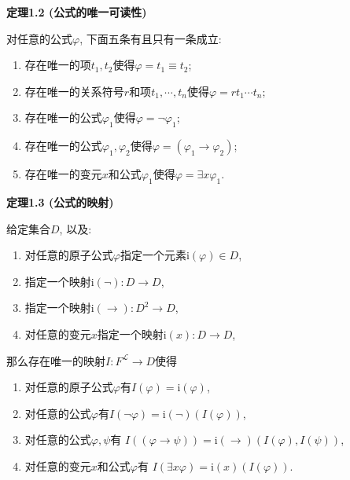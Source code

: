 \documentclass[UTF8]{ctexart}
\begin{document}
\newpage

\hypertarget{sec:定理1.2}{}
\noindent\textbf{定理1.2 (公式的唯一可读性)}

对任意的公式$\varphi$, 下面五条有且只有一条成立:
\begin{enumerate}
    \item 存在唯一的项$t_1,t_2$使得$\varphi=t_1\equiv t_2$;
    \item 存在唯一的关系符号$r$和项$t_1,\cdots,t_n$使得$\varphi=rt_1\cdots t_n$;
    \item 存在唯一的公式$\varphi_1$使得$\varphi=\neg\varphi_1$;
    \item 存在唯一的公式$\varphi_1,\varphi_2$使得$\varphi=(\varphi_1\to\varphi_2)$;
    \item 存在唯一的变元$x$和公式$\varphi_1$使得$\varphi=\exists x\varphi_1$.
\end{enumerate}

\vspace{10pt}

\hypertarget{sec:定理1.3}{}
\noindent\textbf{定理1.3 (公式的映射)}

给定集合$D$, 以及:
\begin{enumerate}
    \item 对任意的原子公式$\varphi$指定一个元素$\mathrm{i}(\varphi)\in D$,
    \item 指定一个映射$\mathrm{i}(\neg):D\to D$,
    \item 指定一个映射$\mathrm{i}(\to):D^2\to D$,
    \item 对任意的变元$x$指定一个映射$\mathrm{i}(x):D\to D$,
\end{enumerate}
那么存在唯一的映射$I:F^{\mathcal{L}}\to D$使得
\begin{enumerate}
    \item 对任意的原子公式$\varphi$有$I(\varphi)=\mathrm{i}(\varphi)$,
    \item 对任意的公式$\varphi$有$I(\neg\varphi)=\mathrm{i}(\neg)(I(\varphi))$,
    \item 对任意的公式$\varphi,\psi$有
    $I((\varphi\to\psi))=\mathrm{i}(\to)(I(\varphi),I(\psi))$,
    \item 对任意的变元$x$和公式$\varphi$有
    $I(\exists x\varphi)=\mathrm{i}(x)(I(\varphi))$.
\end{enumerate}

\end{document}
